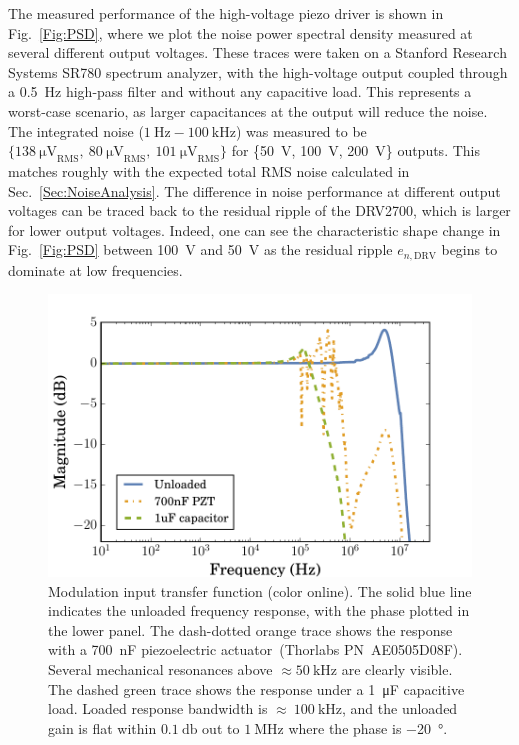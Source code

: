 \documentclass[aip,rsi,reprint]{revtex4-1} %
\begin{document}
The measured performance of the high-voltage piezo driver is shown in Fig.~\ref{Fig:PSD}, where we plot the noise power spectral density measured at several different output voltages.
These traces were taken on a Stanford Research Systems SR780 spectrum analyzer, with the high-voltage output coupled through a \SI{0.5}{\hertz} high-pass filter and without any capacitive load.
This represents a worst-case scenario, as larger capacitances at the output will reduce the noise.
The integrated noise ($\SI{1}{\hertz} - \SI{100}{\kilo\hertz}$) was measured to be $\{\SI{138}{\micro\volt}_\text{RMS},~\SI{80}{\micro\volt}_\text{RMS},~\SI{101}{\micro\volt}_\text{RMS}\}$ for \{\SI{50}{\volt}, \SI{100}{\volt}, \SI{200}{\volt}\} outputs. 
This matches roughly with the expected total RMS noise calculated in Sec.~\ref{Sec:NoiseAnalysis}.
The difference in noise performance at different output voltages can be traced back to the residual ripple of the DRV2700, which is larger for lower output voltages.
Indeed, one can see the characteristic shape change in Fig.~\ref{Fig:PSD} between \SI{100}{\volt} and \SI{50}{\volt} as the residual ripple $e_{n,\text{DRV}}$ begins to dominate at low frequencies.

\begin{figure}[t]
\includegraphics[width=\columnwidth]{PiezoModulationTransfer}
\caption{Modulation input transfer function (color online). The solid blue line indicates the unloaded frequency response, with the phase plotted in the lower panel. The dash-dotted orange trace shows the response with a \SI{700}{\nano\farad} piezoelectric actuator~{(Thorlabs PN~AE0505D08F)}. Several mechanical resonances above $\approx\SI{50}{\kilo\hertz}$ are clearly visible. The dashed green trace shows the response under a \SI{1}{\micro\farad} capacitive load. Loaded response bandwidth is $\approx~\SI{100}{\kilo\hertz}$, and the unloaded gain is flat within $\SI{0.1}{\decibel}$ out to $\SI{1}{\mega\hertz}$ where the phase is \SI{-20}{\degree}.\label{Fig:TransferFunc}}
\end{figure}
\end{document}
